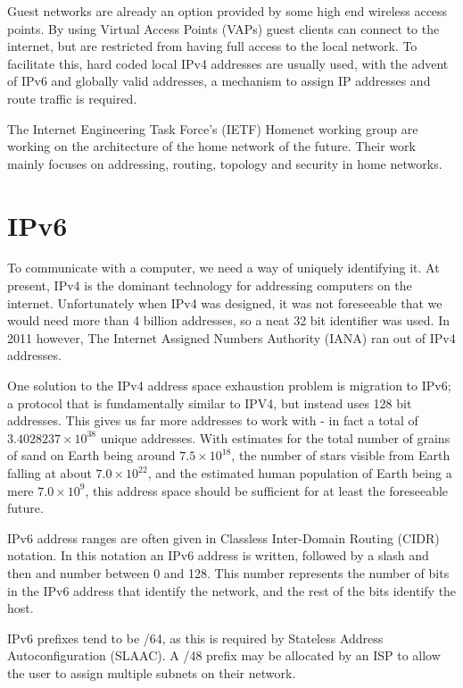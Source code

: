 \documentclass[12pt]{report}
\begin{document}
Guest networks are already an option provided by some high end wireless access
points. By using Virtual Access Points (VAPs)  guest clients can connect to the internet, but are restricted from
having full access to the local network. To facilitate this, hard coded local
IPv4 addresses are usually used, with the advent of IPv6 and globally valid
addresses, a mechanism to assign IP addresses and route traffic is required. 

The Internet Engineering Task Force's (IETF) Homenet working group
\cite{homenet} are working on the architecture of the home network of the
future. Their work mainly focuses on addressing, routing, topology and security
in home networks. 

\section{IPv6}
To communicate with a computer, we need a way of uniquely identifying it. At
present, IPv4 is the dominant technology for addressing computers on the
internet. Unfortunately when IPv4 was designed, it was not foreseeable that we
would need more than 4 billion addresses, so a neat 32 bit identifier was used.
In 2011 however, The Internet Assigned Numbers Authority (IANA)
 ran out of IPv4
addresses. 

One solution to the IPv4 address space exhaustion problem is migration to
IPv6; a protocol that is fundamentally similar to IPV4, but instead uses 128
bit addresses. This gives us far more addresses to work with - in fact a total
of $3.4028237\times10^{38}$ unique addresses. With estimates for the total
number of grains of sand on Earth being around $7.5\times10^{18}$, the number
of stars visible from Earth falling at about $7.0\times10^{22}$, and the
estimated human population of Earth being a mere $7.0\times10^{9}$,
this address space should be sufficient for at least the foreseeable future. 

IPv6 address ranges are often given in Classless Inter-Domain Routing (CIDR)
 notation. In this notation
an IPv6 address is written, followed by a slash and then and number between 0
and 128. This number represents the number of bits in the IPv6 address that
identify the network, and the rest of the bits identify the host.

IPv6 prefixes tend to be /64, as this is required by Stateless Address
Autoconfiguration (SLAAC). A /48 prefix may be allocated by an ISP to allow the user
to assign multiple subnets on their network.
\end{document}
